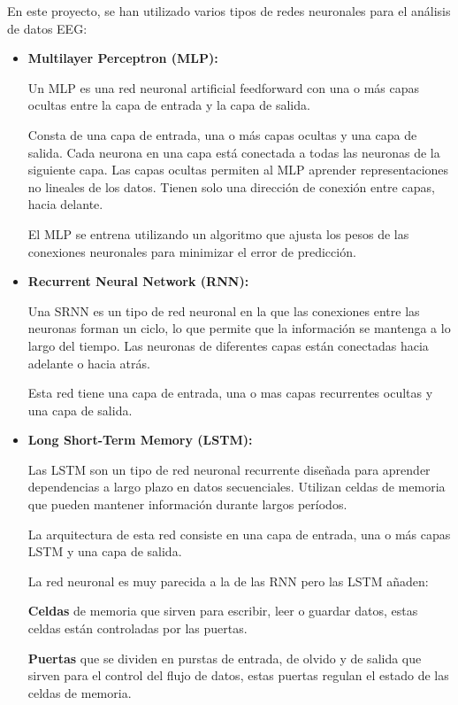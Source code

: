 En este proyecto, se han utilizado varios tipos de redes neuronales para el análisis de datos EEG:		
	
\begin{itemize}

	\item
	\textbf{Multilayer Perceptron (MLP):}

	Un MLP es una red neuronal artificial feedforward con una o más capas ocultas entre la capa de entrada y la capa de salida.
	
	Consta de una capa de entrada, una o más capas ocultas y una capa de salida. Cada neurona en una capa está conectada a todas las neuronas de la siguiente capa. Las capas ocultas permiten al MLP aprender representaciones no lineales de los datos. Tienen solo una dirección de conexión entre capas, hacia delante.
	
	El MLP se entrena utilizando un algoritmo que ajusta los pesos de las conexiones neuronales para minimizar el error de predicción.
	
	

	

	\item
	\textbf{Recurrent Neural Network (RNN):}

	Una SRNN es un tipo de red neuronal en la que las conexiones entre las neuronas forman un ciclo, lo que permite que la información se mantenga a lo largo del tiempo.  Las neuronas de diferentes capas están conectadas hacia adelante o hacia atrás.

	Esta red tiene una capa de entrada, una o mas capas recurrentes ocultas y una capa de salida.
	
	



	\item
	\textbf{Long Short-Term Memory (LSTM):}

	Las LSTM son un tipo de red neuronal recurrente diseñada para aprender dependencias a largo plazo en datos secuenciales. Utilizan celdas de memoria que pueden mantener información durante largos períodos.
	
	La arquitectura de esta red consiste en una capa de entrada, una o más capas LSTM y una capa de salida. 
	
	La red neuronal es muy parecida a la de las RNN pero las LSTM añaden:
	
	\textbf{Celdas} de memoria que sirven para escribir, leer o guardar datos, estas celdas están controladas por las puertas.
	
	\textbf{Puertas} que se dividen en purstas de entrada, de olvido y de salida que sirven para el control del flujo de datos, estas puertas regulan el estado de las celdas de memoria.


\end{itemize}


